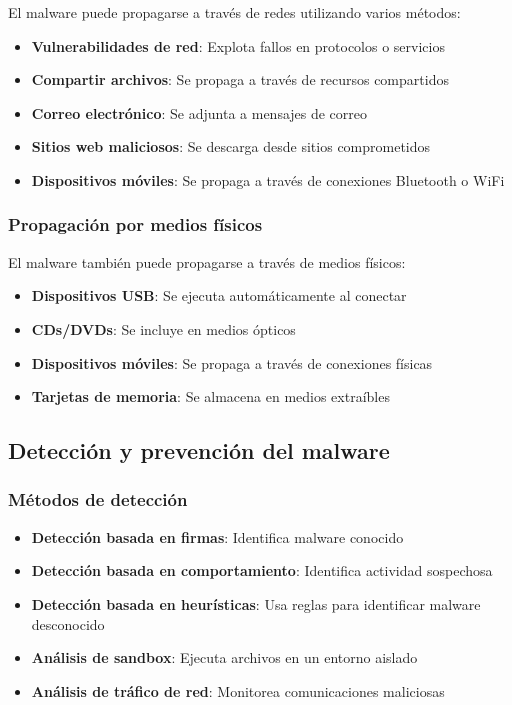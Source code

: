 El malware puede propagarse a través de redes utilizando varios métodos:

\begin{itemize}
    \item \textbf{Vulnerabilidades de red}: Explota fallos en protocolos o servicios
    \item \textbf{Compartir archivos}: Se propaga a través de recursos compartidos
    \item \textbf{Correo electrónico}: Se adjunta a mensajes de correo
    \item \textbf{Sitios web maliciosos}: Se descarga desde sitios comprometidos
    \item \textbf{Dispositivos móviles}: Se propaga a través de conexiones Bluetooth o WiFi
\end{itemize}

\subsubsection{Propagación por medios físicos}

El malware también puede propagarse a través de medios físicos:

\begin{itemize}
    \item \textbf{Dispositivos USB}: Se ejecuta automáticamente al conectar
    \item \textbf{CDs/DVDs}: Se incluye en medios ópticos
    \item \textbf{Dispositivos móviles}: Se propaga a través de conexiones físicas
    \item \textbf{Tarjetas de memoria}: Se almacena en medios extraíbles
\end{itemize}

\subsection{Detección y prevención del malware}

\subsubsection{Métodos de detección}

\begin{itemize}
    \item \textbf{Detección basada en firmas}: Identifica malware conocido
    \item \textbf{Detección basada en comportamiento}: Identifica actividad sospechosa
    \item \textbf{Detección basada en heurísticas}: Usa reglas para identificar malware desconocido
    \item \textbf{Análisis de sandbox}: Ejecuta archivos en un entorno aislado
    \item \textbf{Análisis de tráfico de red}: Monitorea comunicaciones maliciosas
\end{itemize}

